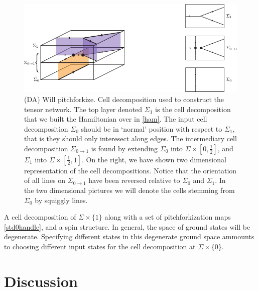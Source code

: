 \documentclass[12pt,a4paper]{article}
\newcounter{arrow}
\newcommand{\ra}{\rightarrow}
\newcommand{\dave}[1]{{\color{ao(english)}\footnotesize{(DA) #1}}}
\begin{document}
\begin{figure}
\begin{center}
\includegraphics{CellDecomposition.pdf}
\caption{\label{CellDecomposition}
\dave{Will pitchforkize.}
Cell decomposition used to construct the tensor network.
The top layer denoted $\Sigma_1$ is the cell decomposition that we built the Hamiltonian over in \eqref{ham}.
The input cell decomposition $\Sigma_0$ should be in `normal' position with respect to $\Sigma_1$, that is they should only interesect along edges. 
The intermediary cell decomposition $\Sigma_{0\ra1}$ is found by extending $\Sigma_0$ into 
$\Sigma \times [0,\frac{1}{2}]$, and $\Sigma_{1}$ into $\Sigma \times [\frac{1}{2},1]$.
On the right, we have shown two dimensional representation of the cell decompositions. 
Notice that the orientation of all lines on $\Sigma_{0 \ra1}$ have been reversed relative to $\Sigma_0$ and $\Sigma_1$. 
In the two dimensional pictures we will denote the cells stemming from $\Sigma_0$ by squiggly lines.
}
\end{center}
\end{figure}


A cell decomposition of $\Sigma \times \{ 1 \}$ along with a set of pitchforkization maps \eqref{std0handle}, and a spin structure.
In general, the space of ground states will be degenerate. 
Specifying different states in this degenerate ground space ammounts to choosing different input states for the cell decomposition at $\Sigma \times \{0 \}$. 

 
\section{Discussion} \label{discussion}
\end{document}
